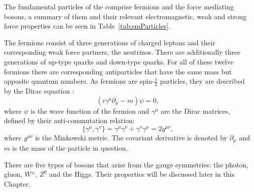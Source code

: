 The fundamental particles of the \SM comprise fermions and the force
mediating bosons, a summary of them and their relevant
electromagnetic, weak and strong force properties can be seen in
Table~\ref{tab:smParticles}. 

The fermions consist of three generations of charged leptons and their
corresponding weak force partners, the neutrinos. There are
additionally three generations of up-type quarks and down-type quarks. For all
of these twelve fermions there are corresponding antiparticles that
have the same mass but opposite quantum numbers. As fermions are
spin-$\frac{1}{2}$ particles, they are described by the Dirac equation
\cite{Griffiths:111880}:
\begin{equation}
(i\gamma^{\mu}\partial_{\mu}-m)\psi=0,
\end{equation}
where $\psi$ is the wave function of the fermion and $\gamma^{\mu}$
are the Dirac matrices, defined by their anti-commutation relation:
\begin{equation}
\{\gamma^{\mu},\gamma^{\nu}\}=\gamma^{\mu}\gamma^{\nu}+\gamma^{\nu}\gamma^{\mu}=2g^{\mu\nu},
\end{equation}
where $g^{\mu\nu}$ is the Minkowski metric. The covariant derivative is denoted
by $\partial_{\mu}$ and $m$ is the mass of the particle in question.

There are five types of bosons that arise from the \SM gauge
symmetries: the photon, gluon, $W^{\pm}$, $Z^0$ and the Higgs. Their
properties will be discussed later in this Chapter.

